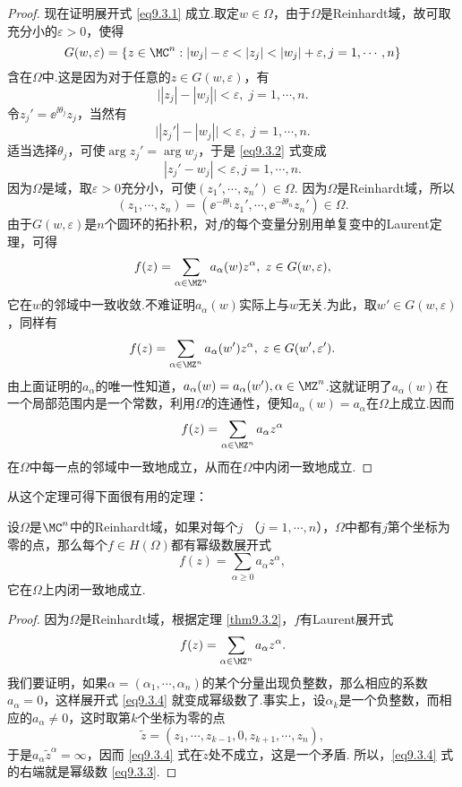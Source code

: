 \begin{proof}
现在证明展开式 \eqref{eq9.3.1} 成立.取定$w\in\Omega$，由于$\Omega$是Reinhardt域，故可取充分小的$\varepsilon>0$，使得
\[G(w,\varepsilon)=\{z\in\MC^n:|w_j|-\varepsilon<|z_j|<|w_j|+\varepsilon,j=1,\cdots,n\}\]
含在$\Omega$中.这是因为对于任意的$z\in G(w,\varepsilon)$，有
\[\big||z_j|-|w_j|\big|<\varepsilon,\;j=1,\cdots,n.\]
令$z_j'=\ee^{\ii\theta_j}z_j$，当然有
\begin{equation}\label{eq9.3.2}
\big||z_j'|-|w_j|\big|<\varepsilon,\;j=1,\cdots,n.
\end{equation}
适当选择$\theta_j$，可使$\arg z_j'=\arg w_j$，于是 \eqref{eq9.3.2} 式变成
\[|z_j'-w_j|<\varepsilon,j=1,\cdots,n.\]
因为$\Omega$是域，取$\varepsilon>0$充分小，可使$(z_1',\cdots,z_n')\in\Omega$. 因为$\Omega$是Reinhardt域，所以
\[(z_1,\cdots,z_n)=(\ee^{-\ii\theta_1}z_1',\cdots,\ee^{-\ii\theta_n}z_n')\in\Omega.\]
由于$G(w,\varepsilon)$是$n$个圆环的拓扑积，对$f$的每个变量分别用单复变中的Laurent定理，可得
\[f(z)=\sum_{\alpha\in\MZ^n}a_\alpha(w)z^\alpha,\;z\in G(w,\varepsilon),\]
它在$w$的邻域中一致收敛.不难证明$a_\alpha(w)$实际上与$w$无关.为此，取$w'\in G(w,\varepsilon)$，同样有
\[f(z)=\sum_{\alpha\in\MZ^n}a_\alpha(w')z^\alpha,\;z\in G(w',\varepsilon').\]
由上面证明的$a_\alpha$的唯一性知道，$a_\alpha(w)=a_\alpha(w'),\alpha\in\MZ^n $.这就证明了$a_\alpha(w)$在一个局部范围内是一个常数，利用$\Omega$的连通性，便知$a_\alpha(w)=a_\alpha$在$\Omega$上成立.因而
\[f(z)=\sum_{\alpha\in\MZ^n}a_\alpha z^\alpha\]
在$\Omega$中每一点的邻域中一致地成立，从而在$\Omega$中内闭一致地成立.
\end{proof}

从这个定理可得下面很有用的定理：
\begin{theorem}\label{thm9.3.3}
设$\Omega$是$\MC^n$中的Reinhardt域，如果对每个$j$
（$j=1,\cdots,n$），$\Omega$中都有$j$第个坐标为零的点，那么每个$f\in H(\Omega)$都有幂级数展开式
\begin{equation}\label{eq9.3.3}
f(z)=\sum_{\alpha\ge0}a_\alpha z^\alpha,
\end{equation}
它在$\Omega$上内闭一致地成立.
\end{theorem}
\begin{proof}
因为$\Omega$是Reinhardt域，根据定理 \ref{thm9.3.2}，$f$有Laurent展开式
\begin{equation}\label{eq9.3.4}
f(z)=\sum_{\alpha\in\MZ^n}a_\alpha z^\alpha.
\end{equation}
我们要证明，如果$\alpha=(\alpha_1,\cdots,\alpha_n)$的某个分量出现负整数，那么相应的系数$a_\alpha=0$，这样展开式 \eqref{eq9.3.4} 就变成幂级数了.事实上，设$\alpha_k$是一个负整数，而相应的$a_\alpha\ne0$，这时取第$k$个坐标为零的点
\[\widetilde{z}=(z_1,\cdots,z_{k-1},0,z_{k+1},\cdots,z_n),\]
于是$a_\alpha\widetilde{z}^\alpha=\infty$，因而 \eqref{eq9.3.4} 式在$\widetilde{z}$处不成立，这是一个矛盾. 所以，\eqref{eq9.3.4} 式的右端就是幂级数 \eqref{eq9.3.3}.
\end{proof}

